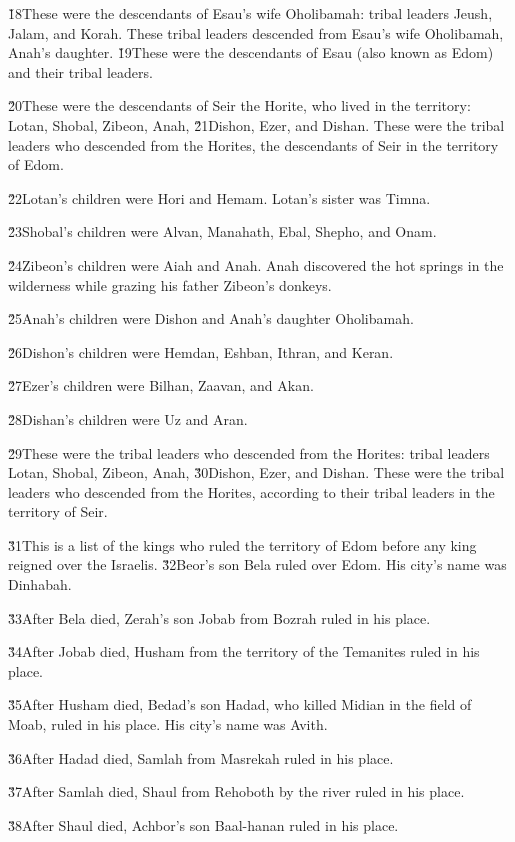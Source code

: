 \v{18}These were the descendants of Esau's wife Oholibamah: tribal leaders Jeush, Jalam, and Korah. These tribal leaders descended from Esau's wife Oholibamah, Anah's daughter. \v{19}These were the descendants of Esau (also known as Edom) and their tribal leaders.

\v{20}These were the descendants of Seir the Horite, who lived in the territory: Lotan, Shobal, Zibeon, Anah, \v{21}Dishon, Ezer, and Dishan. These were the tribal leaders who descended from the Horites, the descendants of Seir in the territory of Edom.

\v{22}Lotan's children were Hori and Hemam. Lotan's sister was Timna.

\v{23}Shobal's children were Alvan, Manahath, Ebal, Shepho, and Onam.

\v{24}Zibeon's children were Aiah and Anah. Anah discovered the hot springs in the wilderness while grazing his father Zibeon's donkeys.

\v{25}Anah's children were Dishon and Anah's daughter Oholibamah.

\v{26}Dishon's children were Hemdan, Eshban, Ithran, and Keran.

\v{27}Ezer's children were Bilhan, Zaavan, and Akan.

\v{28}Dishan's children were Uz and Aran.

\v{29}These were the tribal leaders who descended from the Horites: tribal leaders Lotan, Shobal, Zibeon, Anah, \v{30}Dishon, Ezer, and Dishan. These were the tribal leaders who descended from the Horites, according to their tribal leaders in the territory of Seir.

\v{31}This is a list of the kings who ruled the territory of Edom before any king reigned over the Israelis. \v{32}Beor's son Bela ruled over Edom. His city's name was Dinhabah.

\v{33}After Bela died, Zerah's son Jobab from Bozrah ruled in his place.

\v{34}After Jobab died, Husham from the territory of the Temanites ruled in his place.

\v{35}After Husham died, Bedad's son Hadad, who killed Midian in the field of Moab, ruled in his place. His city's name was Avith.

\v{36}After Hadad died, Samlah from Masrekah ruled in his place.

\v{37}After Samlah died, Shaul from Rehoboth by the river ruled in his place.

\v{38}After Shaul died, Achbor's son Baal-hanan ruled in his place.

